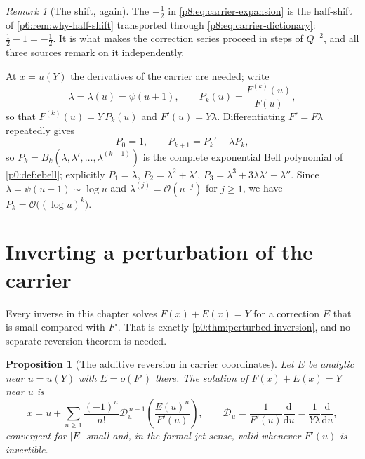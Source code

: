 \documentclass[11pt,a4paper,oneside]{book}
\theoremstyle{plain}
\newtheorem{proposition}[theorem]{Proposition}
\theoremstyle{definition}
\theoremstyle{remark}
\newtheorem{remark}[theorem]{Remark}
\newcommand{\dd}{\mathrm{d}}
\newcommand{\bigO}{\mathcal{O}}
\newcommand{\littleo}{o}
\newcommand{\EB}{B}
\begin{document}
\begin{remark}[The shift, again]\label{p8:rem:shift}
The $-\tfrac12$ in \eqref{p8:eq:carrier-expansion} is the half-shift of
\cref{p6:rem:why-half-shift} transported through
\eqref{p8:eq:carrier-dictionary}: $\tfrac12-1=-\tfrac12$.  It is what makes
the correction series proceed in steps of $Q^{-2}$, and all three sources
remark on it independently.
\end{remark}

At $x=u(Y)$ the derivatives of the carrier are needed; write
\begin{equation}\label{p8:eq:lambda-P}
 \lambda=\lambda(u)=\psi(u+1),
 \qquad
 P_k(u)=\frac{F^{(k)}(u)}{F(u)},
\end{equation}
so that $F^{(k)}(u)=Y\,P_k(u)$ and $F'(u)=Y\lambda$.  Differentiating
$F'=F\lambda$ repeatedly gives
\begin{equation}\label{p8:eq:P-recurrence}
 P_0=1,
 \qquad
 P_{k+1}=P_k'+\lambda P_k,
\end{equation}
so $P_k=\EB_k(\lambda,\lambda',\dots,\lambda^{(k-1)})$ is the complete
exponential Bell polynomial of \cref{p0:def:ebell}; explicitly
$P_1=\lambda$, $P_2=\lambda^{2}+\lambda'$,
$P_3=\lambda^{3}+3\lambda\lambda'+\lambda''$.  Since
$\lambda=\psi(u+1)\sim\log u$ and $\lambda^{(j)}=\bigO(u^{-j})$ for $j\ge1$,
we have $P_k=\bigO\bigl((\log u)^{k}\bigr)$.

\section{Inverting a perturbation of the carrier}
\label{p8:sec:reversion}

Every inverse in this chapter solves $F(x)+E(x)=Y$ for a correction $E$ that
is small compared with $F'$.  That is exactly
\cref{p0:thm:perturbed-inversion}, and no separate reversion theorem is
needed.

\begin{proposition}[The additive reversion in carrier coordinates]
\label{p8:prop:additive}
Let $E$ be analytic near $u=u(Y)$ with $E=\littleo(F')$ there.  The solution of
$F(x)+E(x)=Y$ near $u$ is
\begin{equation}\label{p8:eq:additive}
 x=u+\sum_{n\ge1}\frac{(-1)^{n}}{n!}
 \mathscr{D}_u^{\,n-1}\!\left(\frac{E(u)^{n}}{F'(u)}\right),
 \qquad
 \mathscr{D}_u=\frac1{F'(u)}\frac{\dd}{\dd u}=\frac1{Y\lambda}\frac{\dd}{\dd u},
\end{equation}
convergent for $|E|$ small and, in the formal-jet sense, valid whenever
$F'(u)$ is invertible.
\end{proposition}
\end{document}
